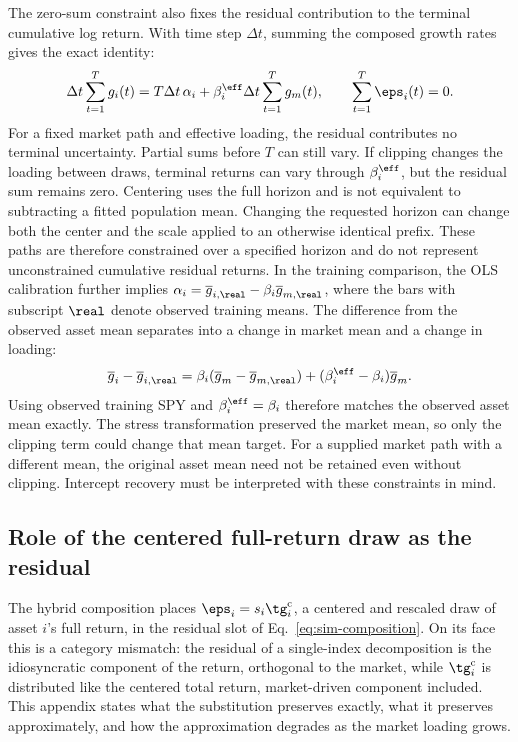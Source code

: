 The zero-sum constraint also fixes the residual contribution to the
terminal cumulative log return. With time step $\Delta t$, summing the
composed growth rates gives the exact identity:
\begin{equation}
  \Delta t\sum_{t=1}^{T} g_i(t)
  = T\Delta t\,\alpha_i
    + \beta_i^{\eff}\Delta t\sum_{t=1}^{T}g_m(t),
  \qquad \sum_{t=1}^{T}\eps_i(t)=0.
  \label{eq:supp-zero-sum-terminal}
\end{equation}
For a fixed market path and effective loading, the residual contributes
no terminal uncertainty. Partial sums before $T$ can still vary. If
clipping changes the loading between draws, terminal returns can vary
through $\beta_i^{\eff}$, but the residual sum remains zero. Centering
uses the full horizon and is not equivalent to subtracting a fitted
population mean. Changing the requested horizon can change both the
center and the scale applied to an otherwise identical prefix. These
paths are therefore constrained over a specified horizon and do not
represent unconstrained cumulative residual returns. In the training
comparison, the OLS calibration further implies
$\alpha_i=\overline{g}_{i,\real}-\beta_i\overline{g}_{m,\real}$,
where the bars with subscript $\real$ denote observed training means.
The difference from the observed asset mean separates into a change
in market mean and a change in loading:
\begin{equation}
  \overline{g}_i-\overline{g}_{i,\real}
  = \beta_i(\overline{g}_m-\overline{g}_{m,\real})
    +(\beta_i^{\eff}-\beta_i)\overline{g}_m.
  \label{eq:supp-training-mean-shift}
\end{equation}
Using observed training SPY and $\beta_i^{\eff}=\beta_i$ therefore
matches the observed asset mean exactly. The stress transformation
preserved the market mean, so only the clipping term could change
that mean target. For a supplied market path with a different mean,
the original asset mean need not be retained even without clipping.
Intercept recovery must be interpreted with these constraints in mind.

\subsection{Role of the centered full-return draw as the residual}
\label{sec:supp-residual-choice}

The hybrid composition places $\eps_i = s_i \tg_i^{\mathrm c}$, a
centered and rescaled draw of asset $i$'s full return, in the residual
slot of Eq.~\eqref{eq:sim-composition}. On its face this is a category
mismatch: the residual of a single-index decomposition is the
idiosyncratic component of the return, orthogonal to the market, while
$\tg_i^{\mathrm c}$ is distributed like the centered total return,
market-driven component included. This appendix states what the
substitution preserves exactly, what it preserves approximately, and
how the approximation degrades as the market loading grows.

